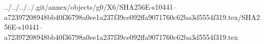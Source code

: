 ../../../../.git/annex/objects/g0/X6/SHA256E-s10441--a72397208948bb40f36798a0ee1a237f39ce092ffa9071760c62ba3d5554f319.tex/SHA256E-s10441--a72397208948bb40f36798a0ee1a237f39ce092ffa9071760c62ba3d5554f319.tex